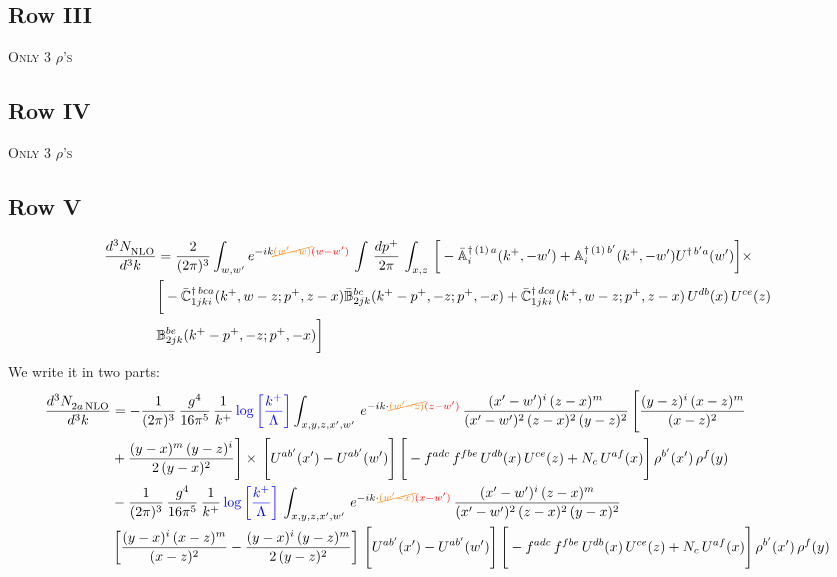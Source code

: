 \documentclass[9pt]{article}
\def\mf#1{\mathbb{#1}}
\numberwithin{equation}{section}
\begin{document}
\subsection{Row III}
\textsc{Only 3 $\rho$'s}
\subsection{Row IV}
\textsc{Only 3 $\rho$'s}
\subsection{Row V}
\begin{align}
    \frac{d^{3}N_{\rm NLO}^{\rm}}{d^{3}k}  & = \frac{2}{(2\pi)^{3}}  \int_{w, w^\prime} e^{-ik{\color{orange}\cancel{(w^\prime-w)}}{\color{red}(w-w^\prime)}}\, \int\, \frac{dp^{+}}{2\pi}\,\int_{x,z}\, \bigg[-\bar{\mf{A}}^{\dagger\,(1)\,a}_{i}(k^{+},-w^{\prime})+\mf{A}^{\dagger\, (1)\, b^{\prime}}_{i}(k^{+},-w^{\prime})U^{\dagger\,b^{\prime}a}(w^{\prime})\bigg]\times\notag \\ & \bigg[-\Bar{\mf{C}}^{\dagger\, bca}_{1jki}(k^{+},w-z;p^{+},z-x)\Bar{\mf{B}}^{bc}_{2jk}(k^{+}-p^{+},- z;p^{+},-x)+\bar{\mf{C}}^{\dagger\, dca}_{1jki}(k^+,w-z; p^+, z-x)\,U^{db}(x)\,U^{ce}(z) \notag \\ & {\mf{B}}^{be}_{2jk} (k^{+}-p^+, -z; p^+, -x) \bigg]\nonumber
\end{align}
We write it in two parts: 
\begin{align}
    \frac{d^{3}N_{2a\,\rm NLO}^{\rm}}{d^{3}k}  & =   - \frac{1}{(2\pi)^{3}}\, \frac{g^{4}}{16\pi^{5}}\,\frac{1}{k^{+}}\,{\color{blue}\log{\left[\frac{k^{+}}{\Lambda}\right]}} \int_{x,y,z,x',w'}\, e^{-ik\cdot{\color{orange}\cancel{(w'-z)}}{\color{red}(z-w')}}\,\frac{(x'-w')^{i}\,(z-x)^{m}}{(x'-w')^{2}\,(z-x)^{2}\, (y-z)^{2}}\,\Bigg[\frac{(y-z)^{i}\,(x-z)^{m}}{(x-z)^{2}}\notag \\ & +\frac{(y-x)^{m}\,(y-z)^{i}}{2\,(y-x)^{2}}\Bigg]\times\, \Bigg[U^{ab'}(x')-U^{ab'}(w')\Bigg]\,\Bigg[-f^{adc}\,f^{fbe}\,U^{db}(x)\,U^{ce}(z)+N_{c}\,U^{af}(x)\Bigg]\,\rho^{b'}(x')\,\rho^{f}(y)\notag \\ & - \frac{1}{(2\pi)^{3}}\, \frac{g^{4}}{16\pi^{5}}\,\frac{1}{k^{+}}\,{\color{blue}\log{\left[\frac{k^{+}}{\Lambda}\right]}}\, \int_{x,y,z,x',w'}\,e^{-ik\cdot{\color{orange}\cancel{(w'-x)}}{\color{red}(x-w')}}\,\frac{(x'-w')^{i}\,(z-x)^{m}}{(x'-w')^{2}\,(z-x)^{2}\,(y-x)^{2}} \notag \\ &\left[\frac{(y-x)^{i}\,(x-z)^{m}}{(x-z)^{2}}-\frac{(y-x)^{i}\,(y-z)^{m}}{2\,(y-z)^{2}}\right]\, \Bigg[U^{ab'}(x')-U^{ab'}(w')\Bigg]\,\Bigg[-f^{adc}\,f^{fbe}\,U^{db}(x)\,U^{ce}(z)+N_{c}\,U^{af}(x)\Bigg]\,\rho^{b'}(x')\,\rho^{f}(y)
\end{align}
\end{document}
